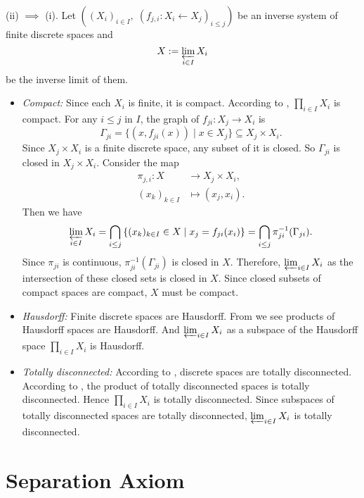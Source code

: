 \documentclass{report}
\begin{document}
\begin{prf}
	(ii) $\implies$ (i). Let $\left((X_i)_{i\in I},\;(f_{j,i}:X_i \leftarrow X_j)_{i\le j}\right)$ be an inverse system of finite discrete spaces and
	\[
	X:=\varprojlim_{i\in I}X_i
	\]
	be the inverse limit of them. 
	\begin{itemize}
\item \emph{Compact:}  Since each $X_i$ is finite, it is compact. According to , $\prod_{i\in I}X_i$ is compact. For any $i\le j$ in $I$, the graph of $f_{ji}:X_j\to X_i$ is
	\[
	\Gamma_{ji}=\{(x,f_{ji}(x))\mid x\in X_j\}\subseteq X_j\times X_i.
	\]
    Since $X_j\times X_i$ is a finite discrete space, any subset of it is closed. So $\Gamma_{ji}$ is closed in $X_j\times X_i$. Consider the map
	\begin{align*}
		\pi_{j,i}:X &\longrightarrow X_j\times X_i,\\
		(x_k)_{k\in I} &\longmapsto (x_j,x_i).
	\end{align*}	 
	Then we have
	\[
	\varprojlim_{i\in I}X_i=\bigcap_{i \le j} \left\{(x_k)_{k\in I}\in X\mid x_j=f_{ji}(x_i)\right\}=\bigcap_{i \le j} \pi_{ji}^{-1}(\Gamma_{ji}).
	\]
	Since $\pi_{ji}$ is continuous, $\pi_{ji}^{-1}(\Gamma_{ji})$ is closed in $X$. Therefore, $\varprojlim_{i\in I}X_i$ as the intersection of these closed sets is closed in $X$. Since closed subsets of compact spaces are compact, $X$ must be compact.
	\item \emph{Hausdorff:}  Finite discrete spaces are Hausdorff. From  we see products of
      Hausdorff spaces are Hausdorff. And $\varprojlim_{i\in I}X_i$ as a subspace of the Hausdorff space $\prod_{i\in I}X_i$ is Hausdorff.
	  \item \emph{Totally disconnected:} According to , discrete spaces are totally disconnected. According to , the product of totally disconnected spaces is totally disconnected. Hence $\prod_{i\in I}X_i$ is totally disconnected. Since subspaces of totally disconnected spaces are totally disconnected, $\varprojlim_{i\in I}X_i$ is totally disconnected.
	\end{itemize}
\end{prf}


\section{Separation Axiom}
\end{document}
